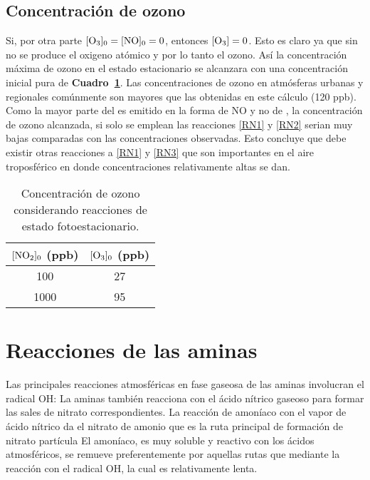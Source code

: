 \subsection{Concentración de ozono}
Si, por otra parte $[\ce{O3}]_0=[\ce{NO}]_0=0$, entonces $[\ce{O3}]=0$. Esto es claro ya que sin  no se produce el oxigeno atómico y por lo tanto el ozono.  Así la concentración máxima de ozono en el estado estacionario se alcanzara con una concentración inicial pura de  \textbf{Cuadro~\ref{ozono_foto}}. Las concentraciones de ozono en atmósferas urbanas y regionales comúnmente son mayores que las obtenidas en este cálculo (120 ppb). Como la mayor parte del   es emitido en la forma de NO y no de  , la concentración de ozono alcanzada, si solo se emplean las reacciones \ref{RN1} y \ref{RN2} serian muy bajas comparadas con  las concentraciones observadas. Esto concluye que debe existir otras reacciones a \ref{RN1} y \ref{RN3} que son importantes en el aire troposférico en donde concentraciones relativamente altas se dan.
\begin{table}[htp]
\caption[Concentración de ozono sin COV]{Concentración de ozono considerando reacciones de estado fotoestacionario.}
\begin{center}
\begin{tabular}{|c|c|}\hline
$[\ce{NO2}]_0$ (ppb) &$[\ce{O3}]_0$ (ppb) \\\hline
100   & 27\\
1000 & 95 \\ \hline
\end{tabular}
\end{center}
\label{ozono_foto}
\end{table}%

\section{Reacciones de las aminas}
Las principales reacciones atmosféricas en fase gaseosa de las aminas involucran el radical OH:
La aminas también reacciona con el ácido nítrico gaseoso para formar las sales de nitrato correspondientes.
La reacción de amoníaco con el vapor de ácido nítrico da el nitrato de amonio que es la ruta principal de formación de nitrato partícula
El amoníaco, es muy soluble y reactivo con los ácidos atmosféricos, se remueve preferentemente por aquellas rutas que mediante la reacción con el radical OH, la cual es relativamente lenta.

